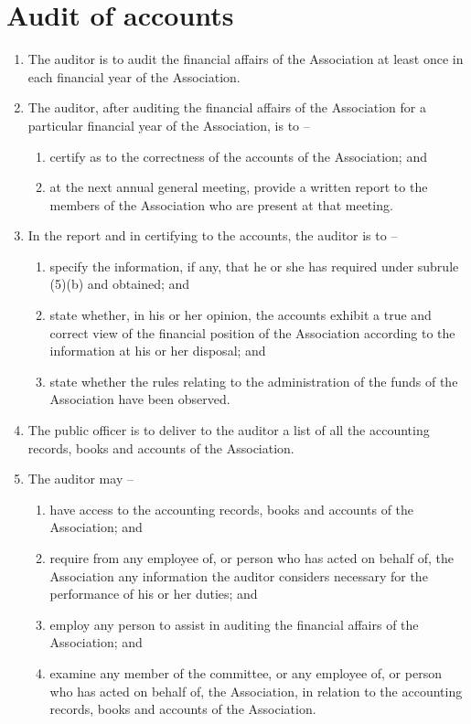\documentclass[a4paper,11pt]{article}
\begin{document}
\section{Audit of accounts}
\begin{enumerate}
	\item The auditor is to audit the financial affairs of the Association at least once in each financial year of the Association.
	
	\item The auditor, after auditing the financial affairs of the Association for a particular financial year of the Association, is to –
	\begin{enumerate}
		\item certify as to the correctness of the accounts of the Association; and
		\item at the next annual general meeting, provide a written report to the members of the Association who are present at that meeting.
	\end{enumerate}

	\item In the report and in certifying to the accounts, the auditor is to --
	\begin{enumerate}
		\item specify the information, if any, that he or she has required under subrule (5)(b) and obtained; and
		\item state whether, in his or her opinion, the accounts exhibit a true and correct view of the financial position of the Association according to the information at his or her disposal; and
		\item state whether the rules relating to the administration of the funds of the Association have been observed.
	\end{enumerate}

	\item The public officer is to deliver to the auditor a list of all the accounting records, books and accounts of the Association.

	\item The auditor may –
	\begin{enumerate}
		\item have access to the accounting records, books and accounts of the Association; and
		\item require from any employee of, or person who has acted on behalf of, the Association any information the auditor considers necessary for the performance of his or her duties; and
		\item employ any person to assist in auditing the financial affairs of the Association; and
		\item examine any member of the committee, or any employee of, or person who has acted on behalf of, the Association, in relation to the accounting records, books and accounts of the Association.
	\end{enumerate}
\end{enumerate}
\end{document}
